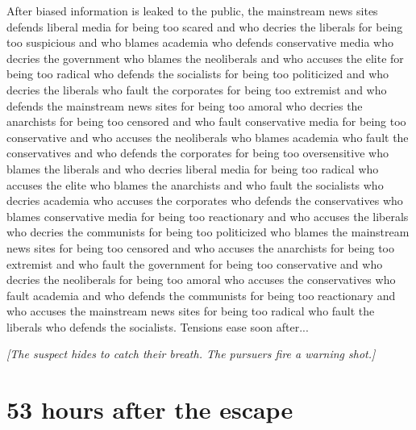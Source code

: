 \documentclass{report}
\begin{document}
After biased information is leaked to the public, the mainstream news sites defends liberal media for being too scared and who decries the liberals for being too suspicious and who blames academia who defends conservative media who decries the government who blames the neoliberals and who accuses the elite for being too radical who defends the socialists for being too politicized and who decries the liberals who fault the corporates for being too extremist and who defends the mainstream news sites for being too amoral who decries the anarchists for being too censored and who fault conservative media for being too conservative and who accuses the neoliberals who blames academia who fault the conservatives and who defends the corporates for being too oversensitive who blames the liberals and who decries liberal media for being too radical who accuses the elite who blames the anarchists and who fault the socialists who decries academia who accuses the corporates who defends the conservatives who blames conservative media for being too reactionary and who accuses the liberals who decries the communists for being too politicized who blames the mainstream news sites for being too censored and who accuses the anarchists for being too extremist and who fault the government for being too conservative and who decries the neoliberals for being too amoral who accuses the conservatives who fault academia and who defends the communists for being too reactionary and who accuses the mainstream news sites for being too radical who fault the liberals who defends the socialists. Tensions ease soon after...

\textit{[The suspect hides to catch their breath. The pursuers fire a warning shot.]}


\section*{53 \small{hours after the escape}}
\end{document}
